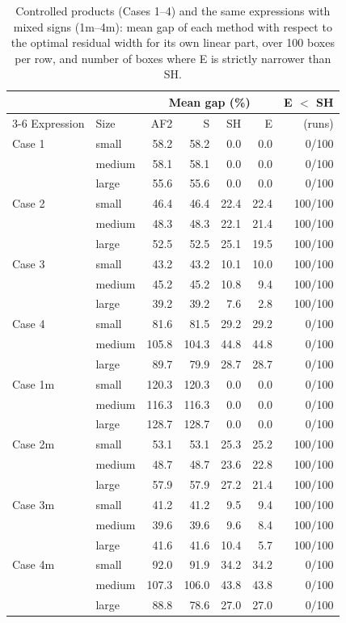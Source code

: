 \begin{table}[t]
\centering
\caption{Controlled products (Cases 1--4) and the same expressions with mixed signs (1m--4m): mean gap of each method with respect to the optimal residual width for its own linear part, over 100 boxes per row, and number of boxes where E is strictly narrower than SH.}
\label{tab:controlled}
\small
\setlength{\tabcolsep}{4pt}
\begin{tabular}{llrrrrr}
\toprule
 & & \multicolumn{4}{c}{Mean gap (\%)} & E $<$ SH \\
\cmidrule(lr){3-6}
Expression & Size & AF2 & S & SH & E & (runs) \\
\midrule
Case 1 & small & 58.2 & 58.2 & 0.0 & 0.0 & 0/100 \\
 & medium & 58.1 & 58.1 & 0.0 & 0.0 & 0/100 \\
 & large & 55.6 & 55.6 & 0.0 & 0.0 & 0/100 \\
\midrule
Case 2 & small & 46.4 & 46.4 & 22.4 & 22.4 & 100/100 \\
 & medium & 48.3 & 48.3 & 22.1 & 21.4 & 100/100 \\
 & large & 52.5 & 52.5 & 25.1 & 19.5 & 100/100 \\
\midrule
Case 3 & small & 43.2 & 43.2 & 10.1 & 10.0 & 100/100 \\
 & medium & 45.2 & 45.2 & 10.8 & 9.4 & 100/100 \\
 & large & 39.2 & 39.2 & 7.6 & 2.8 & 100/100 \\
\midrule
Case 4 & small & 81.6 & 81.5 & 29.2 & 29.2 & 0/100 \\
 & medium & 105.8 & 104.3 & 44.8 & 44.8 & 0/100 \\
 & large & 89.7 & 79.9 & 28.7 & 28.7 & 0/100 \\
\midrule
Case 1m & small & 120.3 & 120.3 & 0.0 & 0.0 & 0/100 \\
 & medium & 116.3 & 116.3 & 0.0 & 0.0 & 0/100 \\
 & large & 128.7 & 128.7 & 0.0 & 0.0 & 0/100 \\
\midrule
Case 2m & small & 53.1 & 53.1 & 25.3 & 25.2 & 100/100 \\
 & medium & 48.7 & 48.7 & 23.6 & 22.8 & 100/100 \\
 & large & 57.9 & 57.9 & 27.2 & 21.4 & 100/100 \\
\midrule
Case 3m & small & 41.2 & 41.2 & 9.5 & 9.4 & 100/100 \\
 & medium & 39.6 & 39.6 & 9.6 & 8.4 & 100/100 \\
 & large & 41.6 & 41.6 & 10.4 & 5.7 & 100/100 \\
\midrule
Case 4m & small & 92.0 & 91.9 & 34.2 & 34.2 & 0/100 \\
 & medium & 107.3 & 106.0 & 43.8 & 43.8 & 0/100 \\
 & large & 88.8 & 78.6 & 27.0 & 27.0 & 0/100 \\
\bottomrule
\end{tabular}
\end{table}